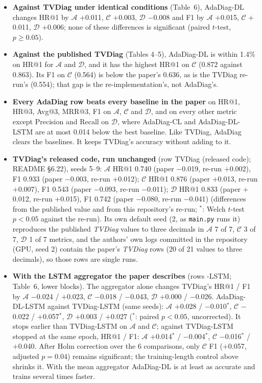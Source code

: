\documentclass[10pt]{article}
\begin{document}
\begin{itemize}\setlength\itemsep{1pt}
\item \textbf{Against TVDiag under identical conditions} (Table~6), AdaDiag-DL changes HR@1 by $\mathcal{A}$ $+$0.011, $\mathcal{C}$ $+$0.003, $\mathcal{D}$ $-$0.008 and F1 by $\mathcal{A}$ $+$0.015, $\mathcal{C}$ $+$0.011, $\mathcal{D}$ $+$0.006; none of these differences is significant (paired $t$-test, $p\geq 0.05$).
\item \textbf{Against the published TVDiag} (Tables 4--5), AdaDiag-DL is within 1.4\% on HR@1 for $\mathcal{A}$ and $\mathcal{D}$, and it has the highest HR@1 on $\mathcal{C}$ (0.872 against 0.863). Its F1 on $\mathcal{C}$ (0.564) is below the paper's 0.636, as is the TVDiag re-run's (0.554); that gap is the re-implementation's, not AdaDiag's.
\item \textbf{Every AdaDiag row beats every baseline in the paper} on HR@1, HR@3, Avg@3, MRR@3, F1 on $\mathcal{A}$, $\mathcal{C}$ and $\mathcal{D}$, and on every other metric except Precision and Recall on $\mathcal{D}$, where AdaDiag-CL and AdaDiag-DL-LSTM are at most 0.014 below the best baseline. Like TVDiag, AdaDiag clears the baselines. It keeps TVDiag's accuracy without adding to it.
\item \textbf{TVDiag's released code, run unchanged} (row TVDiag (released code); README \S6.22), seeds 5--9: $\mathcal{A}$ HR@1 0.740 (paper $-$0.019, re-run $+$0.002), F1 0.933 (paper $-$0.003, re-run $+$0.012); $\mathcal{C}$ HR@1 0.876 (paper $+$0.013, re-run $+$0.007), F1 0.543 (paper $-$0.093, re-run $-$0.011); $\mathcal{D}$ HR@1 0.833 (paper $+$0.012, re-run $+$0.015), F1 0.742 (paper $-$0.080, re-run $-$0.041) (differences from the published value and from this repository's re-run; $^{*}$: Welch $t$-test $p<0.05$ against the re-run). Its own default seed (2, as \texttt{main.py} runs it) reproduces the published \textit{TVDiag} values to three decimals in $\mathcal{A}$ 7 of 7, $\mathcal{C}$ 3 of 7, $\mathcal{D}$ 1 of 7 metrics, and the authors' own logs committed in the repository (GPU, seed 2) contain the paper's \textit{TVDiag} rows (20 of 21 values to three decimals), so those rows are single runs.
\item \textbf{With the LSTM aggregator the paper describes} (rows -LSTM; Table~6, lower blocks). The aggregator alone changes TVDiag's HR@1 / F1 by $\mathcal{A}$ $-$0.024 / $+$0.023, $\mathcal{C}$ $-$0.018 / $-$0.043, $\mathcal{D}$ $+$0.000 / $-$0.026. AdaDiag-DL-LSTM against TVDiag-LSTM (same seeds): $\mathcal{A}$ $+$0.028 / $-$0.010$^{*}$, $\mathcal{C}$ $-$0.022 / $+$0.057$^{*}$, $\mathcal{D}$ $+$0.003 / $+$0.027 ($^{*}$: paired $p<0.05$, uncorrected). It stops earlier than TVDiag-LSTM on $\mathcal{A}$ and $\mathcal{C}$; against TVDiag-LSTM stopped at the same epoch, HR@1 / F1: $\mathcal{A}$ $+$0.014$^{*}$ / $-$0.004$^{*}$, $\mathcal{C}$ $-$0.016$^{*}$ / $+$0.040. After Holm correction over the 6 comparisons, only $\mathcal{C}$ F1 ($+$0.057, adjusted $p=0.04$) remains significant; the training-length control above shrinks it. With the mean aggregator AdaDiag-DL is at least as accurate and trains several times faster.

\end{itemize}
\end{document}
